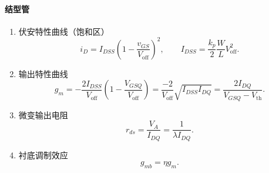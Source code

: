 \documentclass[UTF8,fontset=fandol,zihao=5]{ctexart}
\begin{document}
\paragraph{结型管}

\begin{enumerate}
  \item 伏安特性曲线（饱和区）
  \[
    i_D=I_{DSS}\left(1-\frac{v_{GS}}{V_{\mathrm{off}}}\right)^2,
    \qquad
    I_{DSS}=\frac{k_p}{2}\frac WL V_{\mathrm{off}}^2.
  \]

  \item 输出特性曲线
  \[
    g_m=-\frac{2I_{DSS}}{V_{\mathrm{off}}}
    \left(1-\frac{V_{GSQ}}{V_{\mathrm{off}}}\right)
    =\frac{-2}{V_{\mathrm{off}}}\sqrt{I_{DSS}I_{DQ}}
    =\frac{2I_{DQ}}{V_{GSQ}-V_{\mathrm{th}}}.
  \]

  \item 微变输出电阻
  \[
    r_{ds}=\frac{V_A}{I_{DQ}}=\frac{1}{\lambda I_{DQ}}.
  \]

  \item 衬底调制效应
  \[
    g_{mb}=\eta g_m.
  \]
\end{enumerate}
\end{document}
